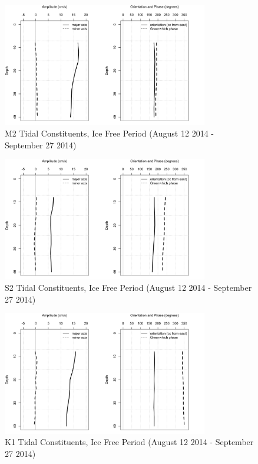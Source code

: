 \documentclass[12pt]{dforeport}
\begin{document}
\begin{figure}  
\centering
\includegraphics[width = 0.8\textwidth]{./figures/48_M2TC_if_2014.png}
\caption[M2 Tidal Constituents, Ice free, 2014]{M2 Tidal Constituents, Ice Free Period (August 12 2014 - September 27 2014)}
\label{f:m2_if_2014}
\end{figure}

\begin{figure}  
\centering
\includegraphics[width = 0.8\textwidth]{./figures/49_S2TC_if_2014.png}
\caption[S2 Tidal Constituents, Ice free, 2014]{S2 Tidal Constituents, Ice Free Period (August 12 2014 - September 27 2014)}
\label{f:s2_if_2014}
\end{figure}

\begin{figure}  
\centering
\includegraphics[width = 0.8\textwidth]{./figures/50_K1TC_if_2014.png}
\caption[K1 Tidal Constituents, Ice free, 2014]{K1 Tidal Constituents, Ice Free Period (August 12 2014 - September 27 2014)}
\label{f:k1_if_2014}
\end{figure}
\end{document}
